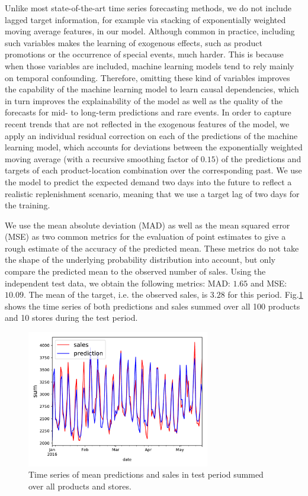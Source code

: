 \documentclass[BCOR=1mm, DIV=calc,10pt,
twoside=true,
twocolumn,
headings=normal]{scrartcl}
\newcommand{\fig}{Fig.}
\begin{document}
Unlike most state-of-the-art time series forecasting methods, we do not include lagged target information, for example via stacking of exponentially weighted moving average features, in our model. Although common in practice, including such variables makes the learning of exogenous effects, such as product promotions or the occurrence of special events, much harder. This is because when those variables are included, machine learning models tend to rely mainly on temporal confounding. Therefore, omitting these kind of variables improves the capability of the machine learning model to learn causal dependencies, which in turn improves the explainability of the model as well as the quality of the forecasts for mid- to long-term predictions and rare events. In order to capture recent trends that are not reflected in the exogenous features of the model, we apply an individual residual correction on each of the predictions of the machine learning model, which accounts for deviations between the exponentially weighted moving average (with a recursive smoothing factor of $0.15$) of the predictions and targets of each product-location combination over the corresponding past. We use the model to predict the expected demand two days into the future to reflect a realistic replenishment scenario, meaning that we use a target lag of two days for the training.

\noindent
We use the mean absolute deviation (MAD) as well as the mean squared error (MSE) as two common metrics for the evaluation of point estimates to give a rough estimate of the accuracy of the predicted mean. These metrics do not take the shape of the underlying probability distribution into account, but only compare the predicted mean to the observed number of sales. Using the independent test data, we obtain the following metrics: MAD: $1.65$ and MSE: $10.09$. The mean of the target, i.e. the observed sales, is $3.28$ for this period. \fig \ref{fig:mean_prediction} shows the time series of both predictions and sales summed over all 100 products and 10 stores during the test period.

\begin{figure}
\begin{center}
\includegraphics[width=8cm]{../figures/ts_full}
\caption{\label{fig:mean_prediction} Time series of mean predictions and sales in test period summed over all products and stores.}
\end{center}
\end{figure}
\end{document}
